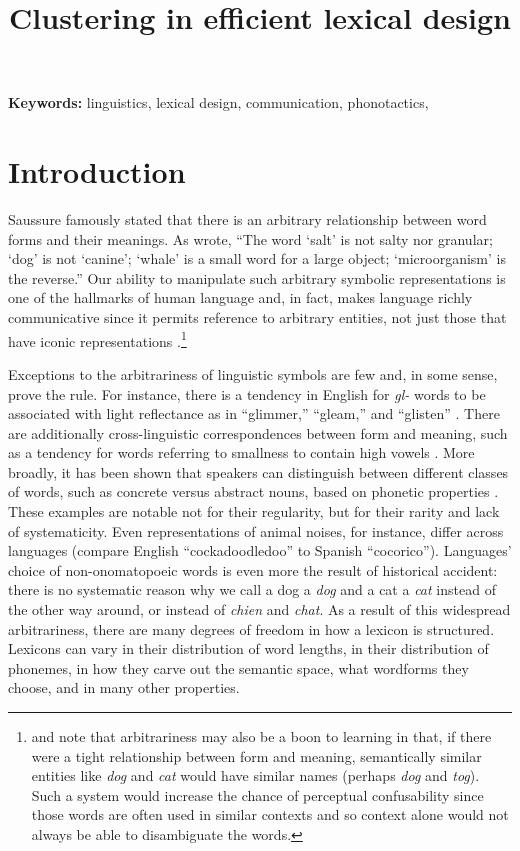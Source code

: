 \documentclass{article}
\title{Clustering in efficient lexical
design}
\begin{document}
\maketitle



\textbf{Keywords:} linguistics, lexical design, communication, phonotactics,

\begin{abstract}
\end{abstract}


\section{Introduction} Saussure famously stated that there is an arbitrary relationship between word forms and
their meanings. As \cite{hockett1960origin} wrote, ``The word `salt' is not salty nor granular; `dog' is not
`canine'; `whale' is a small word for a large object; `microorganism' is the reverse.'' Our ability to
manipulate such arbitrary symbolic representations is one of the hallmarks of human language and, in fact,
makes language richly communicative since it permits reference to arbitrary entities, not just those that have
iconic representations \citep{hockett1960origin}.\footnote{\cite{monaghan_arbitrariness_2011} and
\cite{Gasser2004origins} note that arbitrariness may also be a boon to learning in that, if there were a tight
relationship between form and meaning, semantically similar entities like \textit{dog} and \textit{cat} would
have similar names (perhaps \textit{dog} and \textit{tog}). Such a system would increase the chance of
perceptual confusability since those words are often used in similar contexts and so context alone would not
always be able to disambiguate the words.}

Exceptions to the arbitrariness of linguistic symbols are few and, in some sense, prove the rule. For
instance, there is a tendency in English for \textit{gl-} words to be associated with light reflectance as in
``glimmer,'' ``gleam,'' and ``glisten'' \citep{bergen_psychological_2004}. There are additionally
cross-linguistic correspondences between form and meaning, such as a tendency for words referring to smallness
to contain high vowels \citep{hinton2006sound,sapir1929study}. More broadly, it has been shown that speakers
can distinguish between different classes of words, such as concrete versus abstract nouns, based on phonetic
properties \citep{reilly_arbitrary_2012}. These examples are notable not for their regularity, but for their
rarity and lack of systematicity. Even representations of animal noises, for instance, differ across languages
(compare English ``cockadoodledoo'' to Spanish ``cocorico''). Languages' choice of non-onomatopoeic words is
even more the result of historical accident: there is no systematic reason why we call a dog a \textit{dog}
and a cat a \textit{cat} instead of the other way around, or instead of \textit{chien} and \textit{chat}. As a
result of this widespread arbitrariness, there are many degrees of freedom in how a lexicon is structured.
Lexicons can vary in their distribution of word lengths, in their distribution of phonemes, in how they carve
out the semantic space, what wordforms they choose, and in many other properties.
\end{document}
